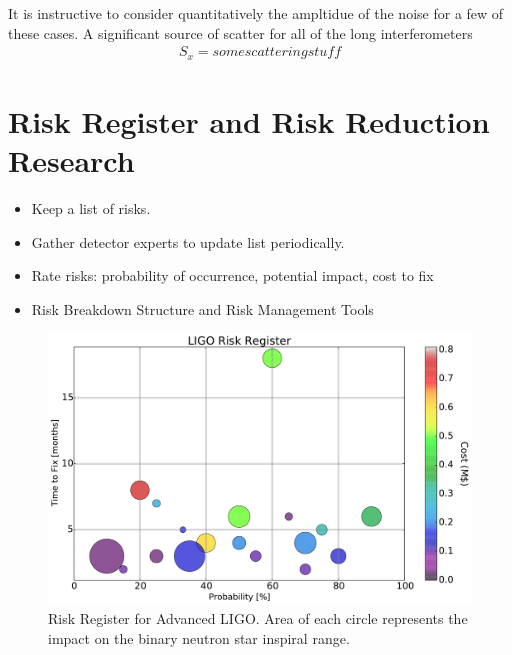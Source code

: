 It is instructive to consider quantitatively the ampltidue of the noise for a few of
these cases. A significant source of scatter for all of the long interferometers
\begin{align}
S_x = some scattering stuff
\end{align}


\section{Risk Register and Risk Reduction Research}

\begin{itemize}
  \item Keep a list of risks.
  \item Gather detector experts to update list periodically.
  \item Rate risks: probability of occurrence, potential impact, cost to fix
  \item Risk Breakdown Structure and Risk Management Tools
\end{itemize}

\begin{figure}[h]
\centering
\includegraphics[width=\columnwidth]{Figures/Risk.pdf}
\caption{Risk Register for Advanced LIGO. Area of each circle represents the impact on the binary neutron star inspiral range.}
\label{fig:RiskBubbles}
\end{figure}

